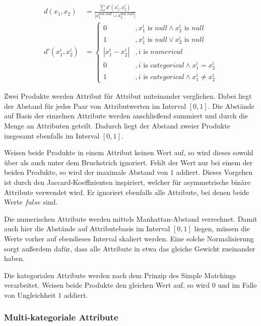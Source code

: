 \begin{align}
    d(x_1, x_2) &= \frac{\sum d'(x_1^i, x_2^i)}{|x_1^{\text{non }null} \cup x_2^{\text{non }null}|} \\
    d'(x_1^i, x_2^i) &= \begin{cases}
        0 &, x_1^i \text{ is } null \wedge x_2^i \text{ is } null \\
        1 &, x_1^i \text{ is } null \vee x_2^i \text{ is } null \\
        |x_1^i - x_2^i| &, i \text{ is } numerical \\
        0 &, i \text{ is } categorical \wedge x_1^i = x_2^i \\
        1 &, i \text{ is } categorical \wedge x_1^i \neq x_2^i
    \end{cases}
\end{align}

Zwei Produkte werden Attribut für Attribut miteinander verglichen. Dabei
liegt der Abstand für jedes Paar von Attributwerten im Interval
\([0,1]\). Die Abstände auf Basis der einzelnen Attribute werden
anschließend summiert und durch die Menge an Attributen geteilt. Dadurch
liegt der Abstand zweier Produkte insgesamt ebenfalls im Interval
\([0,1]\).

Weisen beide Produkte in einem Attribut keinen Wert auf, so wird dieses
sowohl über als auch unter dem Bruchstrich ignoriert. Fehlt der Wert nur
bei einem der beiden Produkte, so wird der maximale Abstand von \(1\)
addiert. Dieses Vorgehen ist durch den Jaccard-Koeffizienten inspiriert,
welcher für asymmetrische binäre Attribute verwendet wird. Er ignoriert
ebenfalls alle Attribute, bei denen beide Werte \(false\) sind.
\autocite[siehe][Kap. 1.2.4 Binary Variables]{kaufman2009}

Die numerischen Attribute werden mittels Manhattan-Abstand verrechnet.
Damit auch hier die Abstände auf Attributebasis im Interval \([0,1]\)
liegen, müssen die Werte vorher auf ebendieses Interval skaliert werden.
Eine solche Normalisierung sorgt außerdem dafür, dass alle Attribute in
etwa das gleiche Gewicht zueinander haben. \autocite[Kap. 1.2.1
Interval-Scaled Variables]{kaufman2009}

Die kategorialen Attribute werden nach dem Prinzip des Simple Matchings
verarbeitet. Weisen beide Produkte den gleichen Wert auf, so wird \(0\)
und im Falle von Ungleichheit \(1\) addiert.

\hypertarget{multi-kategoriale-attribute}{%
\subsubsection{Multi-kategoriale
Attribute}\label{multi-kategoriale-attribute}}

